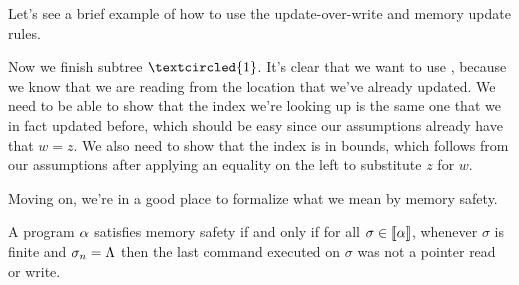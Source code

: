 \documentclass[11pt,twoside]{scrartcl}
\begin{document}
Let's see a brief example of how to use the update-over-write and memory update rules.

\begin{sequentdeduction}[array]
 {
}
\end{sequentdeduction}
Now we finish subtree $\textcircled{1}$.
It's clear that we want to use , because we know that we are reading from the location that we've already updated.
We need to be able to show that the index we're looking up is the same one that we in fact updated before, which should be easy since our assumptions already have that $w = z$.
We also need to show that the index is in bounds, which follows from our assumptions after applying an equality on the left to substitute $z$ for $w$.
\begin{sequentdeduction}[array]
 {
}
\end{sequentdeduction}

Moving on, we're in a good place to formalize what we mean by memory safety.

\begin{definition}
A program $\alpha$ satisfies memory safety if and only if for all $\sigma\in\llbracket\alpha\rrbracket$, whenever $\sigma$ is finite and $\sigma_n = \Lambda$ then the last command executed on $\sigma$ was not a pointer read or write. 
\end{definition}
\end{document}
